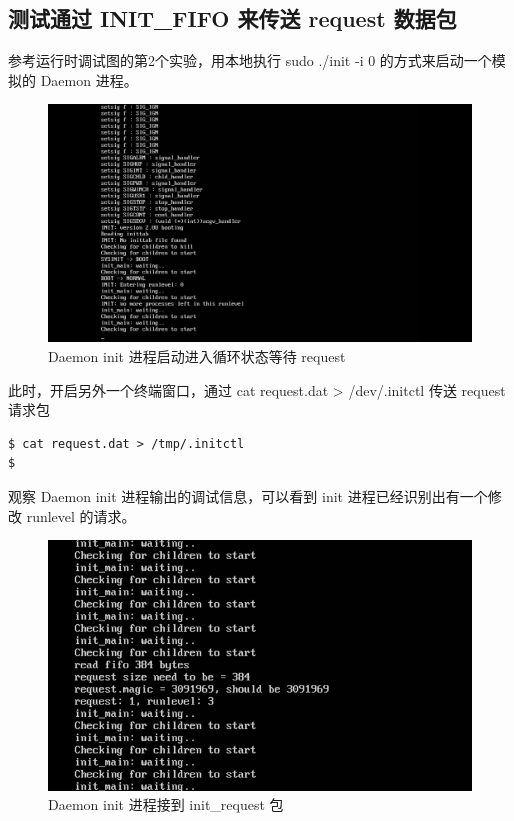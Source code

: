 \subsection{测试通过 INIT\_FIFO 来传送 request 数据包}

参考运行时调试图的第2个实验，用本地执行 sudo ./init -i 0
的方式来启动一个模拟的 Daemon 进程。

\begin{figure}[htbp]
\centering
\includegraphics{./pictures/hack-daemon-init.png}
\caption{Daemon init 进程启动进入循环状态等待 request}
\end{figure}

此时，开启另外一个终端窗口，通过 cat request.dat \textgreater{}
/dev/.initctl 传送 request 请求包

{\begin{shaded}\begin{verbatim}
$ cat request.dat > /tmp/.initctl 
$ 
\end{verbatim}\end{shaded}}
观察 Daemon init 进程输出的调试信息，可以看到 init
进程已经识别出有一个修改 runlevel 的请求。

\begin{figure}[htbp]
\centering
\includegraphics{./pictures/hack-init-fifo.png}
\caption{Daemon init 进程接到 init\_request 包}
\end{figure}

